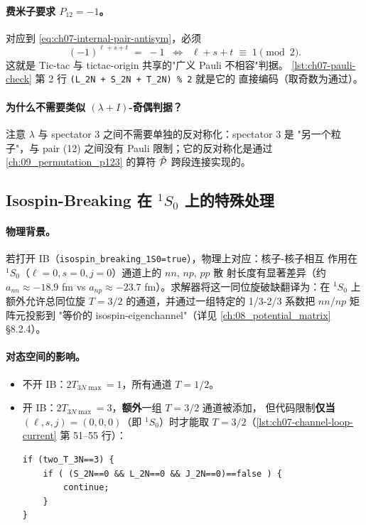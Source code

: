 \paragraph{费米子要求 \(P_{12} = -1\)。}
对应到 \cref{eq:ch07-internal-pair-antisym}，必须
\begin{equation}
\label{eq:ch07-pauli-criterion}
\boxed{\;\;(-1)^{\ell + s + t} \;=\; -1
\;\;\Leftrightarrow\;\;
\ell + s + t \;\equiv\; 1\!\!\!\pmod 2.\;\;}
\end{equation}
这就是 Tic-tac 与 tictac-origin 共享的"广义 Pauli 不相容"判据。
\cref{lst:ch07-pauli-check} 第 2 行 \verb|(L_2N + S_2N + T_2N) % 2| 就是它的
直接编码（取奇数为通过）。

\paragraph{为什么不需要类似 \((\lambda + I)\)-奇偶判据？}
注意 \(\lambda\) 与 spectator 3 之间不需要单独的反对称化：spectator 3 是
"另一个粒子"，与 pair (12) 之间没有 Pauli 限制；它的反对称化是通过
\cref{ch:09_permutation_p123} 的算符 \(\hat{\mathcal{P}}\) 跨段连接实现的。

\subsection{Isospin-Breaking 在 \({}^1S_0\) 上的特殊处理}
\label{subsec:ch07-IB-1S0}

\paragraph{物理背景。}
若打开 IB（\texttt{isospin\_breaking\_1S0=true}），物理上对应：核子-核子相互
作用在 \({}^1S_0\)（\(\ell=0, s=0, j=0\)）通道上的 \(nn\), \(np\), \(pp\) 散
射长度有显著差异（约 \(a_{nn} \approx -18.9\) fm vs \(a_{np} \approx -23.7\)
fm）。求解器将这一同位旋破缺翻译为：在 \({}^1S_0\) 上额外允许总同位旋
\(T = 3/2\) 的通道，并通过一组特定的 1/3-2/3 系数把 \(nn/np\) 矩阵元投影到
"等价的 isospin-eigenchannel"（详见
\cref{ch:08_potential_matrix} \S 8.2.4）。

\paragraph{对态空间的影响。}
\begin{itemize}
  \item 不开 IB：\(2T_{3N\max} = 1\)，所有通道 \(T = 1/2\)。
  \item 开 IB：\(2T_{3N\max} = 3\)，\textbf{额外}一组 \(T = 3/2\) 通道被添加，
        但代码限制\textbf{仅当} \((\ell, s, j) = (0, 0, 0)\)（即
        \({}^1S_0\)）时才能取 \(T = 3/2\)（\cref{lst:ch07-channel-loop-current}
        第 51--55 行）：
\begin{verbatim}
if (two_T_3N==3) {
    if ( (S_2N==0 && L_2N==0 && J_2N==0)==false ) {
        continue;
    }
}
\end{verbatim}
\end{itemize}

